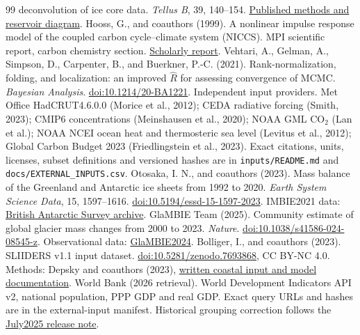 \documentclass[11pt]{article}
\begin{document}
\begin{thebibliography}{99}
deconvolution of ice core data. \emph{Tellus B}, 39, 140--154.
\href{https://b.tellusjournals.se/articles/1693/files/submission/proof/1693-1-15260-1-10-20221121.pdf}{Published methods and reservoir diagram}.
 Hooss, G., and coauthors (1999). A nonlinear impulse
response model of the coupled carbon cycle--climate system (NICCS).
MPI scientific report, carbon chemistry section.
\href{https://climatehomes.unibe.ch/~joos/papers/hooss99mpi.pdf}{Scholarly report}.
 Vehtari, A., Gelman, A., Simpson, D., Carpenter, B., and
Buerkner, P.-C. (2021). Rank-normalization, folding, and localization:
an improved $\widehat R$ for assessing convergence of MCMC.
\emph{Bayesian Analysis}. \href{https://doi.org/10.1214/20-BA1221}{doi:10.1214/20-BA1221}.
 Independent input providers. Met Office HadCRUT4.6.0.0
(Morice et al., 2012); CEDA radiative forcing (Smith, 2023); CMIP6 concentrations
(Meinshausen et al., 2020); NOAA GML CO$_2$ (Lan et al.); NOAA NCEI ocean heat
and thermosteric sea level (Levitus et al., 2012); Global Carbon Budget 2023
(Friedlingstein et al., 2023). Exact citations, units, licenses, subset
definitions and versioned hashes are in \texttt{inputs/README.md} and
\texttt{docs/EXTERNAL\_INPUTS.csv}.
 Otosaka, I. N., and coauthors (2023). Mass balance of the
Greenland and Antarctic ice sheets from 1992 to 2020. \emph{Earth System Science
Data}, 15, 1597--1616. \href{https://doi.org/10.5194/essd-15-1597-2023}{doi:10.5194/essd-15-1597-2023}.
IMBIE2021 data: \href{https://doi.org/10.5285/77B64C55-7166-4A06-9DEF-2E400398E452}{British Antarctic Survey archive}.
 GlaMBIE Team (2025). Community estimate of global glacier
mass changes from 2000 to 2023. \emph{Nature}.
\href{https://doi.org/10.1038/s41586-024-08545-z}{doi:10.1038/s41586-024-08545-z}.
Observational data: \href{https://doi.org/10.5904/wgms-glambie-2024-07}{GlaMBIE2024}.
 Bolliger, I., and coauthors (2023). SLIIDERS v1.1 input
dataset. \href{https://doi.org/10.5281/zenodo.7693868}{doi:10.5281/zenodo.7693868},
CC BY-NC 4.0. Methods: Depsky and coauthors (2023),
\href{https://egusphere.copernicus.org/preprints/2022/egusphere-2022-198/egusphere-2022-198-manuscript-version7.pdf}{written coastal input and model documentation}.
 World Bank (2026 retrieval). World Development Indicators
API v2, national population, PPP GDP and real GDP. Exact query URLs and hashes
are in the external-input manifest. Historical grouping correction follows the
\href{https://datatopics.worldbank.org/world-development-indicators/release-note/jul-2025.html}{July2025 release note}.

\end{thebibliography}
\end{document}

